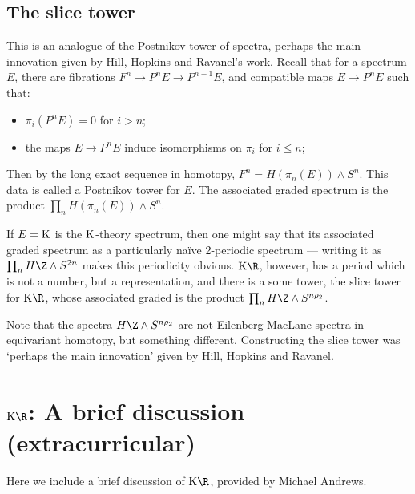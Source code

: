 \documentclass[11pt]{article}
\newcommand{\Extracurricular}[1]{
\section*{#1 {\small(extracurricular)}}
}
\begin{document}
\begin{FirstWeek}
\subsection*{The slice tower}
This is an analogue of the Postnikov tower of spectra, perhaps the main
innovation given by Hill, Hopkins and Ravanel's work. Recall that for a spectrum $E$, there are
fibrations $F^n\to P^nE\to P^{n-1}E$, and compatible maps $E\to P^nE$ such that:
\begin{itemize}\squishlist
\item $\pi_{i}(P^n E)=0$ for $i>n$;
\item the maps $E\to P^nE$ induce isomorphisms on $\pi_{i}$ for $i\leq n$;
\end{itemize}
Then by the long exact sequence in homotopy, $F^n=H(\pi_n(E))\wedge S^n$. This
data is called a Postnikov tower for $E$.
The associated graded spectrum is the product $\prod_nH(\pi_n(E))\wedge S^n$.

If $E=\operatorname{{K}}$ is the $\operatorname{{K}}$-theory spectrum, then one might say that its associated
graded spectrum as a particularly na\"ive 2-periodic spectrum --- writing it as
$\prod_n {H\Z}\wedge S^{2n}$ makes this periodicity obvious. $\KR$, however, has
a period which is not a number, but a representation, and there is a some tower,
the slice tower for $\KR$, whose associated graded is the product $\prod_n
{H\Z}\wedge S^{n\rho_2}$.

Note that the spectra ${H\Z}\wedge S^{n\rho_2}$ are not Eilenberg-MacLane
spectra in equivariant homotopy, but something different. Constructing the slice
tower was `perhaps the main innovation' given by Hill, Hopkins and Ravanel.

\Extracurricular{$\KR$: A brief discussion}
Here we include a brief discussion of $\KR$, provided by Michael Andrews.

\end{FirstWeek}
\end{document}
